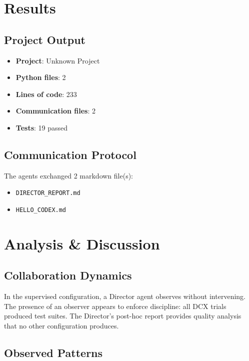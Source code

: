 \documentclass[11pt,a4paper]{article}
\begin{document}
\section{Results}

\subsection{Project Output}

\begin{itemize}
  \item \textbf{Project}: Unknown Project
  \item \textbf{Python files}: 2
  \item \textbf{Lines of code}: 233
  \item \textbf{Communication files}: 2
  \item \textbf{Tests}: 19 passed
\end{itemize}

\subsection{Communication Protocol}

The agents exchanged 2 markdown file(s):
\begin{itemize}
  \item \texttt{DIRECTOR\_REPORT.md}
  \item \texttt{HELLO\_CODEX.md}
\end{itemize}

\section{Analysis \& Discussion}

\subsection{Collaboration Dynamics}

In the supervised configuration, a Director agent observes without intervening. The presence of an observer appears to enforce discipline: all DCX trials produced test suites. The Director's post-hoc report provides quality analysis that no other configuration produces.

\subsection{Observed Patterns}
\end{document}

